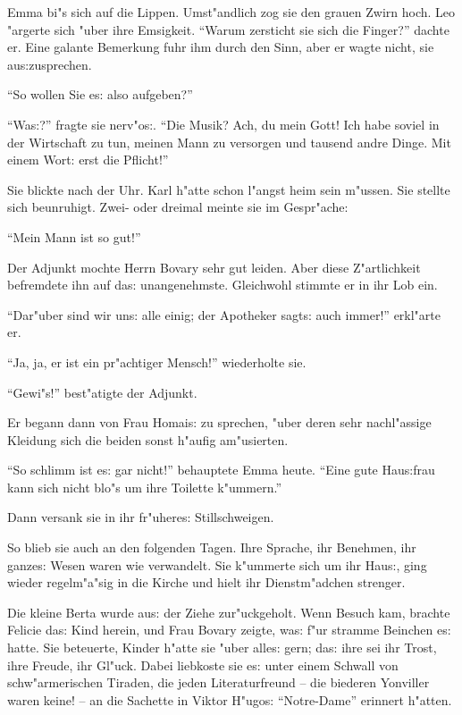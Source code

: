 \documentclass[oneside,12pt]{book}
\newcommand{\s}{s:}%
\begin{document}
Emma bi"s sich auf die Lippen. Umst"andlich zog sie den grauen
Zwirn hoch. Leo "argerte sich "uber ihre Emsigkeit. "`Warum
zersticht sie sich die Finger?"' dachte er. Eine galante Bemerkung
fuhr ihm durch den Sinn, aber er wagte nicht, sie
au{\s}zusprechen.

"`So wollen Sie e{\s} also aufgeben?"'

"`Wa{\s}?"' fragte sie nerv"o{\s}. "`Die Musik? Ach, du mein Gott!
Ich habe soviel in der Wirtschaft zu tun, meinen Mann zu versorgen
und tausend andre Dinge. Mit einem Wort: erst die Pflicht!"'

Sie blickte nach der Uhr. Karl h"atte schon l"angst heim sein
m"ussen. Sie stellte sich beunruhigt. Zwei- oder dreimal meinte
sie im Gespr"ache:

"`Mein Mann ist so gut!"'

Der Adjunkt mochte Herrn Bovary sehr gut leiden. Aber diese
Z"artlichkeit befremdete ihn auf da{\s} unangenehmste. Gleichwohl
stimmte er in ihr Lob ein.

"`Dar"uber sind wir un{\s} alle einig; der Apotheker sagt{\s} auch
immer!"' erkl"arte er.

"`Ja, ja, er ist ein pr"achtiger Mensch!"' wiederholte sie.

"`Gewi"s!"' best"atigte der Adjunkt.

Er begann dann von Frau Homai{\s} zu sprechen, "uber deren sehr
nachl"assige Kleidung sich die beiden sonst h"aufig am"usierten.

"`So schlimm ist e{\s} gar nicht!"' behauptete Emma heute. "`Eine
gute Hau{\s}frau kann sich nicht blo"s um ihre Toilette k"ummern."'

Dann versank sie in ihr fr"uhere{\s} Stillschweigen.

So blieb sie auch an den folgenden Tagen. Ihre Sprache, ihr
Benehmen, ihr ganze{\s} Wesen waren wie verwandelt. Sie k"ummerte
sich um ihr Hau{\s}, ging wieder regelm"a"sig in die Kirche und
hielt ihr Dienstm"adchen strenger.

Die kleine Berta wurde au{\s} der Ziehe zur"uckgeholt. Wenn Besuch
kam, brachte Felicie da{\s} Kind herein, und Frau Bovary zeigte,
wa{\s} f"ur stramme Beinchen e{\s} hatte. Sie beteuerte, Kinder
h"atte sie "uber alle{\s} gern; da{\s} ihre sei ihr Trost, ihre
Freude, ihr Gl"uck. Dabei liebkoste sie e{\s} unter einem Schwall
von schw"armerischen Tiraden, die jeden Literaturfreund -- die
biederen Yonviller waren keine! -- an die Sachette in Viktor
H"ugo{\s} "`Notre-Dame"' erinnert h"atten.
\end{document}
